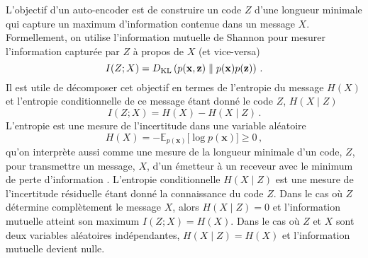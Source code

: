 L'objectif d'un auto-encoder est de construire un code $Z$ d'une longueur minimale qui capture un maximum d'information contenue dans un message $X$. 
Formellement, on utilise l'information mutuelle de Shannon pour mesurer l'information capturée par $Z$ à propos de $X$ (et vice-versa)
\begin{equation}\label{eq:ShannonInfo}
        I(Z ; X) = D_{\mathrm{KL}}\left(p(\mathbf{x}, \mathbf{z}) \KL p(\mathbf{x}) p(\mathbf{z})\right)\, . %
\end{equation} 
Il est utile de décomposer cet objectif en termes de l'entropie du message $H(X)$ et l'entropie 
conditionnelle de ce message étant donné le code $Z$, $H(X \mid Z)$
\begin{equation}\label{eq:info entropy}
       I(Z; X) = H(X) - H(X \mid Z) \, .
\end{equation} 
L'entropie est une mesure de l'incertitude dans une variable aléatoire
\begin{equation}\label{eq:entropy}
        H(X) = -\mathbb{E}_{p(\mathbf{x})}\big[\log p(\mathbf{x}) \big] \geq 0\, ,
\end{equation} 
qu'on interprète aussi comme une mesure de la longueur minimale d'un code, $Z$, pour 
transmettre un message, $X$, d'un émetteur à un receveur avec le minimum de perte d'information \citep{Shannon1948,Kolmogorov1965}.
L'entropie conditionnelle $H(X \mid Z)$ est une  mesure de l'incertitude résiduelle étant donné la connaissance du code $Z$. Dans le cas où $Z$ 
détermine complètement le message $X$, alors $H(X \mid Z) = 0$ et l'information mutuelle atteint son maximum $I(Z; X) = H(X)$.
Dans le cas où $Z$ et $X$ sont deux variables aléatoires indépendantes, $H(X \mid Z) = H(X)$ et l'information mutuelle devient nulle.

